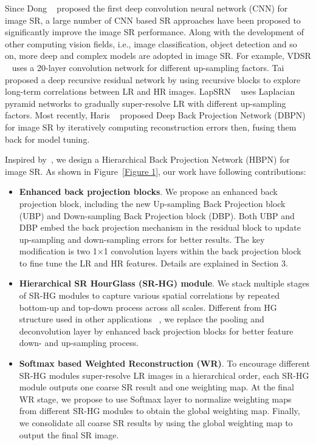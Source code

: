 \documentclass[10pt,twocolumn,letterpaper]{article}
\begin{document}
Since Dong \etal ~\cite{SRCNN} proposed the first deep convolution neural network (CNN) for image SR, a large number of CNN based SR approaches have been proposed to significantly improve the image SR performance. Along with the development of other computing vision fields, i.e., image classification, object detection and so on, more deep and complex models are adopted in image SR. For example, VDSR ~\cite{VDSR} uses a 20-layer convolution network for different up-sampling factors. Tai \etal ~\cite{DRRN} proposed a deep recursive residual network by using recursive blocks to explore long-term correlations between LR and HR images. LapSRN ~\cite{LapSRN} uses Laplacian pyramid networks to gradually super-resolve LR with different up-sampling factors. Most recently, Haris \etal ~\cite{DBPN} proposed Deep Back Projection Network (DBPN) for image SR by iteratively computing reconstruction errors then, fusing them back for model tuning. 

Inspired by~\cite{DBPN}, we design a Hierarchical Back Projection Network (HBPN) for image SR. As shown in Figure~\ref{Figure 1}, our work have following contributions:
\begin{itemize}
\item \textbf{Enhanced back projection blocks}. We propose an enhanced back projection block, including the new Up-sampling Back Projection block (UBP) and Down-sampling Back Projection block (DBP). Both UBP and DBP embed the back projection mechanism in the residual block to update up-sampling and down-sampling errors for better results. The key modification is two 1$\times$1 convolution layers within the back projection block to fine tune the LR and HR features. Details are explained in Section 3.
\item \textbf{Hierarchical SR HourGlass (SR-HG) module}. We stack multiple stages of SR-HG modules to capture various spatial correlations by repeated bottom-up and top-down process across all scales. Different from HG structure used in other applications ~\cite{HG1,HG2}, we replace the pooling and deconvolution layer by enhanced back projection blocks for better feature down- and up-sampling process.
\item \textbf{Softmax based Weighted Reconstruction (WR)}. To encourage different SR-HG modules super-resolve LR images in a hierarchical order, each SR-HG module outputs one coarse SR result and one weighting map. At the final WR stage, we propose to use Softmax layer to normalize weighting maps from different SR-HG modules to obtain the global weighting map. Finally, we consolidate all coarse SR results by using the global weighting map to output the final SR image.
\end{itemize}
\end{document}

